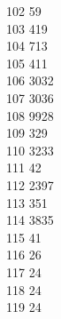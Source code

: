 { 102	59 \\
 103	419 \\
 104	713 \\
 105	411 \\
 106	3032 \\
 107	3036 \\
 108	9928 \\
 109	329 \\
 110	3233 \\
 111	42 \\
 112	2397 \\
 113	351 \\
 114	3835 \\
 115	41 \\
 116	26 \\
 117	24 \\
 118	24 \\
 119	24 \\
}
